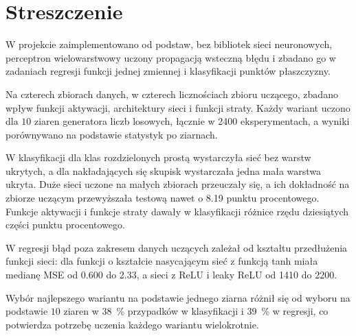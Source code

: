 \section*{Streszczenie}
\label{sec:abstract}

W projekcie zaimplementowano od podstaw, bez bibliotek sieci neuronowych, perceptron wielowarstwowy uczony propagacją wsteczną błędu i zbadano go w zadaniach regresji funkcji jednej zmiennej i klasyfikacji punktów płaszczyzny.

Na czterech zbiorach danych, w czterech licznościach zbioru uczącego, zbadano wpływ funkcji aktywacji, architektury sieci i funkcji straty. Każdy wariant uczono dla $10$ ziaren generatora liczb losowych, łącznie w \num{2400} eksperymentach, a wyniki porównywano na podstawie statystyk po ziarnach.

W klasyfikacji dla klas rozdzielonych prostą wystarczyła sieć bez warstw ukrytych, a dla nakładających się skupisk wystarczała jedna mała warstwa ukryta. Duże sieci uczone na małych zbiorach przeuczały się, a ich dokładność na zbiorze uczącym przewyższała testową nawet o \num{8.19} punktu procentowego. Funkcje aktywacji i funkcje straty dawały w klasyfikacji różnice rzędu dziesiątych części punktu procentowego.

W regresji błąd poza zakresem danych uczących zależał od kształtu przedłużenia funkcji sieci: dla funkcji o kształcie nasycającym sieć z funkcją tanh miała medianę MSE od \num{0.600} do \num{2.33}, a sieci z ReLU i leaky ReLU od \num{1410} do \num{2200}.

Wybór najlepszego wariantu na podstawie jednego ziarna różnił się od wyboru na podstawie $10$ ziaren w \qty{38}{\percent} przypadków w klasyfikacji i \qty{39}{\percent} w regresji, co potwierdza potrzebę uczenia każdego wariantu wielokrotnie.
